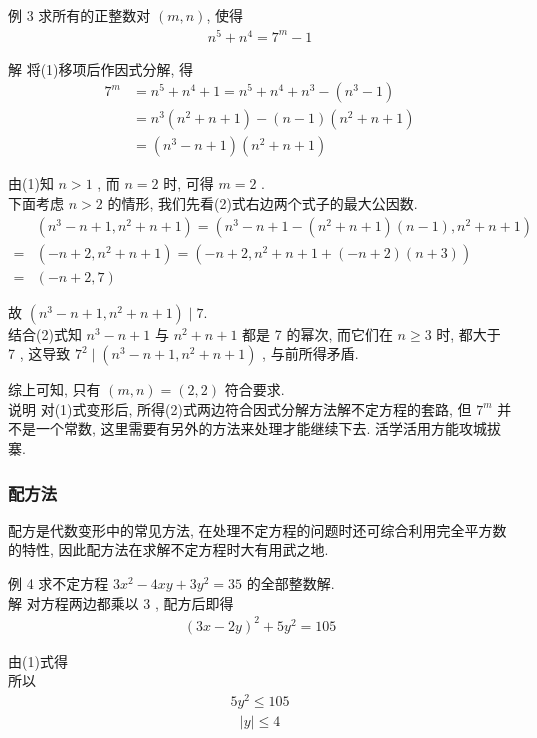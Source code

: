 例 3 求所有的正整数对 $(m, n)$, 使得
\begin{align*}
	n^{5}+n^{4}=7^{m}-1
\end{align*}

解 将(1)移项后作因式分解, 得\begin{align}
	7^{m} & =n^{5}+n^{4}+1=n^{5}+n^{4}+n^{3}-\left(n^{3}-1\right)    \\
	      & =n^{3}\left(n^{2}+n+1\right)-(n-1)\left(n^{2}+n+1\right) \\
	      & =\left(n^{3}-n+1\right)\left(n^{2}+n+1\right)
\end{align}

由(1)知 $n>1$ , 而 $n=2$ 时, 可得 $m=2$ . \\
下面考虑 $n>2$ 的情形, 我们先看(2)式右边两个式子的最大公因数.\begin{align}
	  & \left(n^{3}-n+1, n^{2}+n+1\right)=\left(n^{3}-n+1-\left(n^{2}+n+1\right)(n-1), n^{2}+n+1\right) \\
	= & \left(-n+2, n^{2}+n+1\right)=\left(-n+2, n^{2}+n+1+(-n+2)(n+3)\right)                           \\
	= & (-n+2,7)
\end{align}

故 $\left(n^{3}-n+1, n^{2}+n+1\right) \mid 7$.\\
结合(2)式知 $n^{3}-n+1$ 与 $n^{2}+n+1$ 都是 7 的幂次, 而它们在 $n \geqslant 3$ 时, 都大于 7 , 这导致 $7^{2} \mid\left(n^{3}-n+1, n^{2}+n+1\right)$ , 与前所得矛盾.

综上可知, 只有 $(m, n)=(2,2)$ 符合要求.\\
说明 对(1)式变形后, 所得(2)式两边符合因式分解方法解不定方程的套路, 但 $7^{m}$ 并不是一个常数, 这里需要有另外的方法来处理才能继续下去. 活学活用方能攻城拔寨.

\subsubsection{配方法}
配方是代数变形中的常见方法, 在处理不定方程的问题时还可综合利用完全平方数的特性, 因此配方法在求解不定方程时大有用武之地.

例 4 求不定方程 $3 x^{2}-4 x y+3 y^{2}=35$ 的全部整数解. \\
解 对方程两边都乘以 3 , 配方后即得
\begin{align*}
	(3 x-2 y)^{2}+5 y^{2}=105
\end{align*}

由(1)式得\\
所以
\begin{align*}
	5 y^{2} \leqslant 105
\end{align*}
\begin{align*}
	|y| \leqslant 4
\end{align*}


